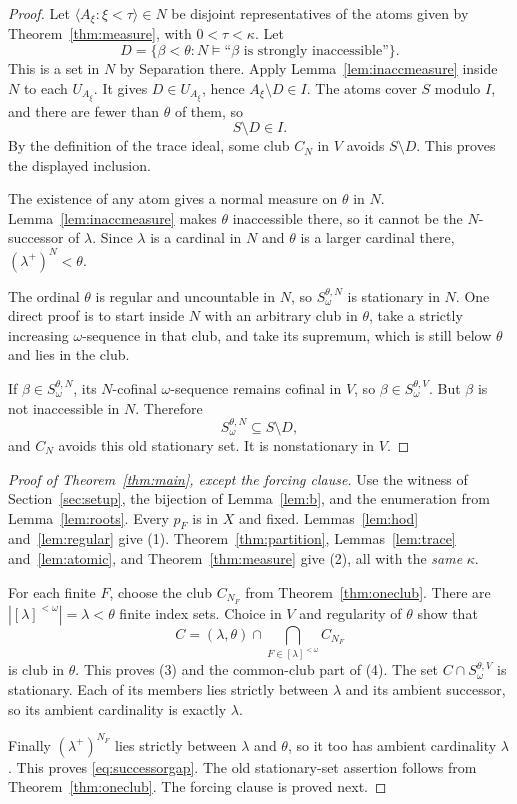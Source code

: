 \documentclass[11pt,letterpaper]{article}
\theoremstyle{definition}
\numberwithin{equation}{section}
\begin{document}
\begin{proof}
Let $\langle A_\xi:\xi<\tau\rangle\in N$ be disjoint representatives of the atoms given by Theorem~\ref{thm:measure}, with $0<\tau<\kappa$. Let
\[
D=\{\beta<\theta:N\models\text{``$\beta$ is strongly inaccessible''}\}.
\]
This is a set in $N$ by Separation there. Apply Lemma~\ref{lem:inaccmeasure} inside $N$ to each $U_{A_\xi}$. It gives $D\in U_{A_\xi}$, hence $A_\xi\setminus D\in I$. The atoms cover $S$ modulo $I$, and there are fewer than $\theta$ of them, so
\[
S\setminus D\in I.
\]
By the definition of the trace ideal, some club $C_N$ in $V$ avoids $S\setminus D$. This proves the displayed inclusion.

The existence of any atom gives a normal measure on $\theta$ in $N$. Lemma~\ref{lem:inaccmeasure} makes $\theta$ inaccessible there, so it cannot be the $N$-successor of $\lambda$. Since $\lambda$ is a cardinal in $N$ and $\theta$ is a larger cardinal there, $(\lambda^+)^N<\theta$.

The ordinal $\theta$ is regular and uncountable in $N$, so $S_\omega^{\theta,N}$ is stationary in $N$. One direct proof is to start inside $N$ with an arbitrary club in $\theta$, take a strictly increasing $\omega$-sequence in that club, and take its supremum, which is still below $\theta$ and lies in the club.

If $\beta\in S_\omega^{\theta,N}$, its $N$-cofinal $\omega$-sequence remains cofinal in $V$, so $\beta\in S_\omega^{\theta,V}$. But $\beta$ is not inaccessible in $N$. Therefore
\[
S_\omega^{\theta,N}\subseteq S\setminus D,
\]
and $C_N$ avoids this old stationary set. It is nonstationary in $V$.
\end{proof}

\begin{proof}[Proof of Theorem~\ref{thm:main}, except the forcing clause]
Use the witness of Section~\ref{sec:setup}, the bijection of Lemma~\ref{lem:b}, and the enumeration from Lemma~\ref{lem:roots}. Every $p_F$ is in $X$ and fixed. Lemmas~\ref{lem:hod} and~\ref{lem:regular} give (1). Theorem~\ref{thm:partition}, Lemmas~\ref{lem:trace} and~\ref{lem:atomic}, and Theorem~\ref{thm:measure} give (2), all with the \emph{same} $\kappa$.

For each finite $F$, choose the club $C_{N_F}$ from Theorem~\ref{thm:oneclub}. There are $|[\lambda]^{<\omega}|=\lambda<\theta$ finite index sets. Choice in $V$ and regularity of $\theta$ show that
\begin{equation}\label{eq:clubintersect}
C=(\lambda,\theta)\cap\bigcap_{F\in[\lambda]^{<\omega}}C_{N_F}
\end{equation}
is club in $\theta$. This proves (3) and the common-club part of (4). The set $C\cap S_\omega^{\theta,V}$ is stationary. Each of its members lies strictly between $\lambda$ and its ambient successor, so its ambient cardinality is exactly $\lambda$.

Finally $(\lambda^+)^{N_F}$ lies strictly between $\lambda$ and $\theta$, so it too has ambient cardinality $\lambda$. This proves \eqref{eq:successorgap}. The old stationary-set assertion follows from Theorem~\ref{thm:oneclub}. The forcing clause is proved next.
\end{proof}
\end{document}
